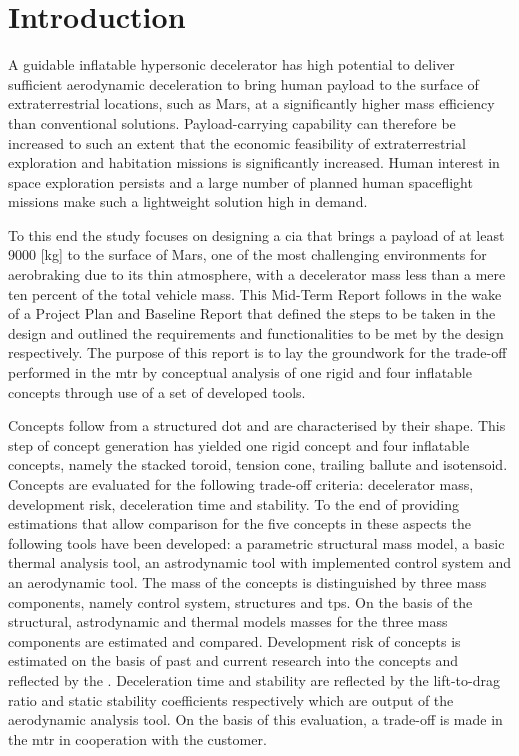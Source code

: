 \section{Introduction}
\label{cha:introduction}
A guidable inflatable hypersonic decelerator has high potential to deliver sufficient aerodynamic deceleration to bring human payload to the surface of extraterrestrial locations, such as Mars, at a significantly higher mass efficiency than conventional solutions. Payload-carrying capability can therefore be increased to such an extent that the economic feasibility of extraterrestrial exploration and habitation missions is significantly increased. Human interest in space exploration persists and a large number of planned human spaceflight missions make such a lightweight solution high in demand. 

To this end the study focuses on designing a \acrfull{cia} that brings a payload of at least 9000 [kg] to the surface of Mars, one of the most challenging environments for aerobraking due to its thin atmosphere, with a decelerator mass less than a mere ten percent of the total vehicle mass. This Mid-Term Report follows in the wake of a Project Plan and Baseline Report that defined the steps to be taken in the design and outlined the requirements and functionalities to be met by the design respectively. The purpose of this report is to lay the groundwork for the trade-off performed in the \acrfull{mtr} by conceptual analysis of one rigid and four inflatable concepts through use of a set of developed tools.

Concepts follow from a structured \acrfull{dot} and are characterised by their shape. This step of concept generation has yielded one rigid concept and four inflatable concepts, namely the stacked toroid, tension cone, trailing ballute and isotensoid. Concepts are evaluated for the following trade-off criteria: decelerator mass, development risk, deceleration time and stability. To the end of providing estimations that allow comparison for the five concepts in these aspects the following tools have been developed: a parametric structural mass model, a basic thermal analysis tool, an astrodynamic tool with implemented control system and an aerodynamic tool. The mass of the concepts is distinguished by three mass components, namely control system, structures and \acrfull{tps}. On the basis of the structural, astrodynamic and thermal models masses for the three mass components are estimated and compared. Development risk of concepts is estimated on the basis of past and current research into the concepts and reflected by the . Deceleration time and stability are reflected by the lift-to-drag ratio and static stability coefficients respectively which are output of the aerodynamic analysis tool. On the basis of this evaluation, a trade-off is made in the \gls{mtr} in cooperation with the customer.

